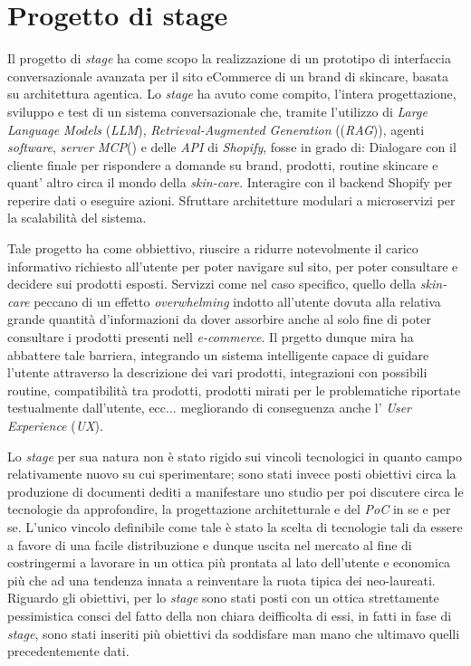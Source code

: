 \section{Progetto di stage}

Il progetto di \emph{stage} ha come scopo la realizzazione di un prototipo di interfaccia conversazionale
avanzata per il sito eCommerce di un brand di skincare, basata su architettura agentica.
Lo \emph{stage} ha avuto come compito, l'intera progettazione, sviluppo e test di un sistema conversazionale che, tramite l'utilizzo
di \emph{Large Language Models} (\emph{LLM}), \emph{Retrieval-Augmented Generation} ((\emph{RAG})), agenti \emph{software},  \emph{server} \emph{MCP}() e delle \emph{API} di \emph{Shopify}, fosse in grado di:
Dialogare con il cliente finale per rispondere a domande su brand, prodotti, routine skincare e quant' altro circa il mondo della \emph{skin-care}.
Interagire con il backend Shopify per reperire dati o eseguire azioni.
Sfruttare architetture modulari a microservizi per la scalabilità del sistema.

Tale progetto ha come obbiettivo, riuscire a ridurre notevolmente il carico informativo richiesto all'utente per poter navigare sul sito, per poter consultare e decidere sui prodotti esposti.
Servizzi come nel caso specifico, quello della \emph{skin-care} peccano di un effetto \emph{overwhelming} indotto all'utente dovuta alla relativa grande quantità d'informazioni da dover assorbire
anche al solo fine di poter consultare i prodotti presenti nell \emph{e-commerce}.
Il prgetto dunque mira ha abbattere tale barriera, integrando un sistema intelligente capace di guidare l'utente attraverso la descrizione dei vari prodotti, integrazioni con possibili routine, 
compatibilità tra prodotti, prodotti mirati per le problematiche riportate testualmente dall'utente, ecc... megliorando di conseguenza anche l' \emph{User Experience} (\emph{UX}).


Lo \emph{stage} per sua natura non è stato rigido sui vincoli tecnologici in quanto campo relativamente nuovo su cui sperimentare; sono stati invece posti obiettivi circa la produzione di 
documenti dediti a manifestare uno studio per poi discutere circa le tecnologie da approfondire, la progettazione architetturale e del \emph{PoC} in se e per se.
L'unico vincolo definibile come tale è stato la scelta di tecnologie tali da essere a favore di una facile distribuzione e dunque uscita nel mercato al fine di costringermi a lavorare in un 
ottica più prontata al lato dell'utente e economica più che ad una tendenza innata a reinventare la ruota tipica dei neo-laureati.
Riguardo gli obiettivi, per lo \emph{stage} sono stati posti con un ottica strettamente pessimistica consci del fatto della non chiara deifficolta di essi, in fatti in fase di \emph{stage},
sono stati inseriti più obiettivi da soddisfare man mano che ultimavo quelli precedentemente dati.

